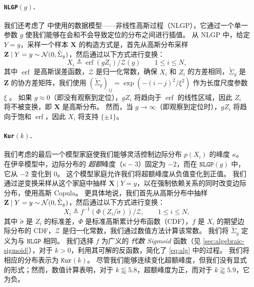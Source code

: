 

\paragraph{\texttt{NLGP}$(g)$.}\hspace{-2pt}
我们还考虑了 \textcite{ingrosso2022data} 中使用的数据模型——非线性高斯过程（NLGP），它通过一个单一参数 $g$ 使我们能够在会和不会导致定位的分布之间进行插值。
从 NLGP 中，给定 $Y = y$，采样一个样本 $\mathbf{X}$ 的构造方式是，首先从高斯分布采样 $\mathbf{Z} \mid Y = y \sim \operatorname{\mathcal{N}}(0, \tilde{\Sigma}_y)$，然后通过以下方式进行变换：
\begin{equation} \label{eq:nlgp}
    X_i \triangleq \operatorname{erf}(g Z_i) / \mathcal{Z}(g) \qquad 1 \leq i \leq N,
\end{equation}
其中 $\operatorname{erf}$ 是高斯误差函数，$\mathcal{Z}$ 是归一化常数，确保 $X_i$ 和 $Z_i$ 的方差相同，$\tilde{\Sigma}_y$ 是 $\mathbf{Z}$ 的协方差矩阵，我们使用 $(\tilde{\Sigma}_y)_{ij} = \exp(-(i-j)^2/\xi^2)$ 作为长度尺度参数 $\xi$ \cite{ingrosso2022data}。
如果 $g \approx 0$（即没有观察到定位），$g Z_i$ 将趋向于 $\operatorname{erf}$ 的线性区域，因此 $Z_i$ 将不被变换，即 $\mathbf{X}$ 是高斯分布。
然而，当 $g \to \infty$（即观察到定位时），$g Z_i$ 将趋向于饱和 $\operatorname{erf}$，因此 $X_i$ 将支持 $\{ \pm 1 \}$。

\paragraph{\texttt{Kur}$(k)$.}\hspace{-2pt}
我们考虑的最后一个模型家庭使我们能够灵活控制边际分布 $p(X_i)$ 的峰度 $\kappa$。
在伊辛模型中，边际分布的 \emph{超额}峰度（$\kappa - 3$）固定为 $-2$，而在 $\texttt{NLGP}(g)$ 中，它从 $-2$ 变化到 $0$。
这个模型家庭允许我们将超额峰度从负值变化到正值。
我们通过逆变换采样从这个家庭中抽样 $\mathbf{X} \mid Y = y$，以在强制依赖关系的同时改变边际分布，使用高斯 Copula。
更具体地说，我们首先从高斯分布中抽样 $\mathbf{Z} \mid Y = y \sim \operatorname{\mathcal{N}}(0, \tilde{\Sigma}_y)$，然后通过以下方式进行变换：
\begin{equation}
    X_i \triangleq f^{-1}( \Phi( Z_i / \tilde{\sigma} )) / \mathcal{Z}, \qquad 1 \leq i \leq N, \label{eq:alg}
\end{equation}
其中 $\tilde{\sigma}$ 是 $Z_i$ 的标准差，$\Phi$ 是标准高斯累计分布函数（CDF），$f$ 是 $X_i$ 的期望边际分布的 CDF，$\mathcal{Z}$ 是归一化常数，我们通过数值方法计算该常数。
我们将 $\tilde{\Sigma}_y$ 定义为与 $\texttt{NLGP}$ 相同。
我们选择 $f$ 为广义的 \emph{代数 Sigmoid} 函数（见 \cref{sec:algebraic-sigmoid}），对于 $k > 0$，利用其可解的反函数，简化了 \cref{eq:alg} 中的过程。
我们将相应的分布表示为 $\texttt{Kur}(k)$。
尽管我们能够连续变化超额峰度，但我们没有显式的形式；然而，数值计算表明，对于 $k \lessapprox 5.8$，超额峰度为正，而对于 $k \gtrapprox 5.9$，它为负。
